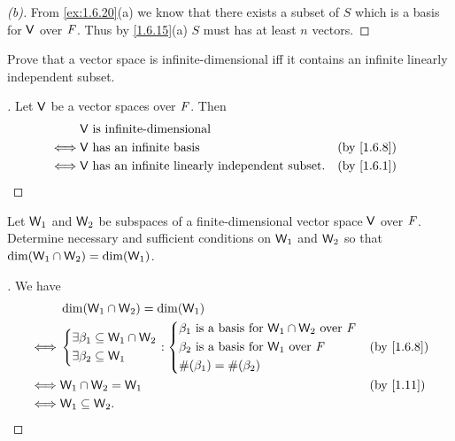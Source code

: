 \begin{proof}[(b)]
  From \cref{ex:1.6.20}(a) we know that there exists a subset of \(S\) which is a basis for \(\mathsf{V}\) over \(\mathit{F}\).
  Thus by \cref{1.6.15}(a) \(S\) must has at least \(n\) vectors.
\end{proof}

\begin{ex}\label{ex:1.6.21}
  Prove that a vector space is infinite-dimensional iff it contains an infinite linearly independent subset.
\end{ex}

\begin{proof}[]
  Let \(\mathsf{V}\) be a vector spaces over \(\mathit{F}\).
  Then
  \begin{align*}
         & \V \text{ is infinite-dimensional}                                      \\
    \iff & \V \text{ has an infinite basis}                        &  & \by{1.6.8} \\
    \iff & \V \text{ has an infinite linearly independent subset}. &  & \by{1.6.1}
  \end{align*}
\end{proof}

\begin{ex}\label{ex:1.6.22}
  Let \(\mathsf{W}_1\) and \(\mathsf{W}_2\) be subspaces of a finite-dimensional vector space \(\mathsf{V}\) over \(\mathit{F}\).
  Determine necessary and sufficient conditions on \(\mathsf{W}_1\) and \(\mathsf{W}_2\) so that \(\dim(\mathsf{W}_1 \cap \mathsf{W}_2) = \dim(\mathsf{W}_1)\).
\end{ex}

\begin{proof}[]
  We have
  \begin{align*}
         & \dim(\W_1 \cap \W_2) = \dim(\W_1)                                                 \\
    \iff & \begin{dcases}
             \exists \beta_1 \subseteq \W_1 \cap \W_2 \\
             \exists \beta_2 \subseteq \W_1
           \end{dcases} : \begin{dcases}
                            \beta_1 \text{ is a basis for } \W_1 \cap \W_2 \text{ over } \F \\
                            \beta_2 \text{ is a basis for } \W_1 \text{ over } \F           \\
                            \#(\beta_1) = \#(\beta_2)
                          \end{dcases} &  & \by{1.6.8}    \\
    \iff & \W_1 \cap \W_2 = \W_1                                              &  & \by{1.11} \\
    \iff & \W_1 \subseteq \W_2.
  \end{align*}
\end{proof}


